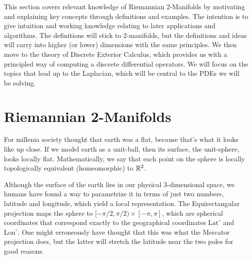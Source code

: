 \ifdefined\COMPILINGFROMMAIN
\else
    
    
\fi
This section covers relevant knowledge of Riemannian 2-Manifolds by motivating and explaining key concepts through definitions and examples. The intention is to give intuition and working knowledge relating to later applications and algorithms. The definitions will stick to 2-manifolds, but the definitions and ideas will carry into higher (or lower) dimensions with the same principles. 
We then move to the theory of Discrete Exterior Calculus, which provides us with a principled way of computing a discrete differential operators. We will focus on the topics that lead up to the Laplacian, which will be central to the PDEs we will be solving.

\section*{Riemannian 2-Manifolds}

For millenia society thought that earth was a flat, because that's what it looks like up close. If we model earth as a unit-ball, then its surface, the unit-sphere, looks locally flat. Mathematically, we say that each point on the sphere is locally topologically equivalent (homeomorphic) to $\mathbb{R}^2$.

Although the surface of the earth lies in our physical 3-dimensional space, we humans have found a way to parametrize it in terms of just two numbers, latitude and longitude, which yield a local representation. The Equirectangular projection maps the sphere to $[-\pi/2, \pi/2) \times [-\pi, \pi]$, which are spherical coordinates that correspond exactly to the geographical coordinates $\text{Lat}^\circ$ and $\text{Lon}^\circ$. One might erroneously have thought that this was what the Mercator projection does, but the latter will stretch the latitude near the two poles for good reasons.
    
